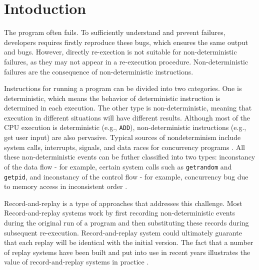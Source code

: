 \section{Intoduction}
The program often fails. To sufficiently understand and prevent failures,
developers requires firstly reproduce these bugs, which ensures the same output
and bugs. However, directly
re-exection is not suitable for non-deterministic failures, as they may not
appear in a re-execution procedure. Non-deterministic failures are the
consequence of non-deterministic instructions. 

Instructions for running a program can be divided into two categories. One is
deterministic, which means the behavior of deterministic instruction is determined in each
execution. The other type is non-deterministic, meaning that execution in
different situations will have different results. Although most of the CPU
execution is deterministic (e.g., \texttt{ADD}), non-deterministic instructions (e.g., get user input) are also pervasive.
Typical sources of nondeterminism include system calls, interrupts, signals, and
data races for concurrency programs \cite{ronsse_recplay_1999}. All these non-deterministic events can be futher classified into two types:
inconstancy of the data flow - for example, certain system calls such as
\texttt{getrandom} and \texttt{getpid}, and inconstancy of the control flow
- for example, concurrency bug due to memory access in inconsistent order \cite{getrandom2}.

Record-and-replay is a type of approaches that addresses this challenge. Most
Record-and-replay systems work by first recording non-deterministic events
during the original run of a program and then substituting these records during
subsequent re-execution. Record-and-replay system could ultimately guarante that
each replay will be identical with the initial version. The fact that a number
of replay systems have been built and put into use in recent years illustrates
the value of record-and-replay systems in practice \cite{203227,replay_survey,altekar_odr_2009,bhansali_framework_2006}.


